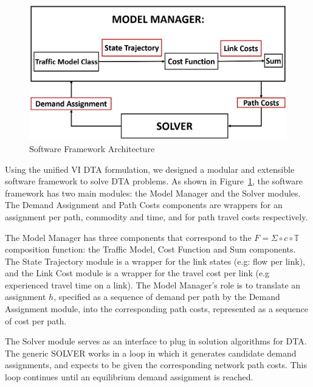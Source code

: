 \documentclass[conference]{IEEEtran}
\renewcommand{\:}{\mathrel{\coloneqq}}
\renewcommand{\=}{\ensuremath{\eqqcolon}}
\newcommand{\0}{\ensuremath{\boldsymbol{0}}}
\begin{document}
\begin{figure}[h]
    \centering
    \includegraphics[width=\linewidth]{Software_Block_Diagram.PNG}
    \caption{Software Framework Architecture}
    \label{fig:Block_Diagram}
\end{figure}

Using the unified VI DTA formulation, we designed a modular and extensible
software framework to solve DTA problems. As shown in Figure~\ref{fig:Block_Diagram}, the software framework has two main modules: the Model Manager and the Solver modules. The Demand Assignment and Path Costs components are wrappers for an assignment per path, commodity and time, and for path travel costs respectively.

The Model Manager has three components that correspond to the $F = \Sigma\circ c \circ \mathbb{T}$ composition function: the Traffic Model, Cost Function and Sum components. The State Trajectory module is a wrapper for the link states (e.g: flow per link), and the Link Cost module is a wrapper for the travel cost per link (e.g experienced travel time on a link). The Model Manager's role is to translate an assignment $h$, specified as a sequence of demand per path by the Demand Assignment module, into the corresponding path costs, represented as a sequence of cost per path.

The Solver module serves as an interface to plug in solution algorithms for DTA. The generic SOLVER works in a loop in which it generates candidate demand assignments, and expects to be given the corresponding network path costs. This loop continues until an equilibrium demand assignment is reached. 
\end{document}
